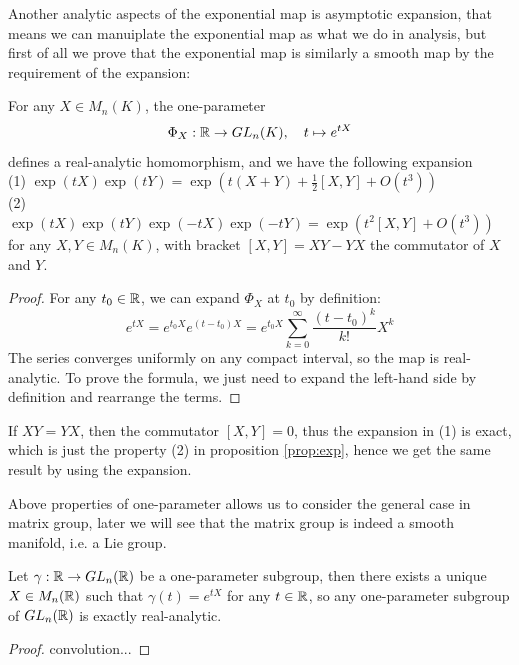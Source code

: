 Another analytic aspects of the exponential map is asymptotic expansion, that means we can manuiplate the exponential map as what we do in analysis, but first of all we prove that the exponential map is similarly a smooth map by the requirement of the expansion:

\begin{proposition}
    For any \(X \in M_n(K)\), the one-parameter
    \[\Phi_X: \mathbb{R} \to GL_n(K), \quad t \mapsto e^{tX}\]
    defines a real-analytic homomorphism, and we have the following expansion\\

    (1) \(\exp(tX)\exp(tY) = \exp(t(X+Y)+\frac{1}{2}[X,Y]+O(t^3))\)\\
    
    (2) \(\exp(tX)\exp(tY)\exp(-tX)\exp(-tY) = \exp(t^2[X,Y]+O(t^3))\)\\

    for any \(X,Y \in M_n(K)\), with bracket \([X,Y] = XY - YX\) the commutator of \(X\) and \(Y\).
\end{proposition}
\begin{proof}
    For any \(t_0 \in \mathbb{R}\), we can expand \(\Phi_X\) at \(t_0\) by definition:
    \[e^{tX} = e^{t_0X}e^{(t-t_0)X} = e^{t_0X} \sum_{k=0}^\infty \frac{(t-t_0)^k}{k!} X^k\]
    The series converges uniformly on any compact interval, so the map is real-analytic. To prove the formula, we just need to expand the left-hand side by definition and rearrange the terms.
\end{proof}

\begin{remark}
    If \(XY = YX\), then the commutator \([X,Y] = 0\), thus the expansion in (1) is exact, which is just the property (2) in proposition \ref{prop:exp}, hence we get the same result by using the expansion.
\end{remark}

Above properties of one-parameter allows us to consider the general case in matrix group, later we will see that the matrix group is indeed a smooth manifold, i.e. a Lie group.

\begin{theorem}
    Let \(\gamma: \mathbb{R} \to GL_n(\mathbb{R})\) be a one-parameter subgroup, then there exists a unique \(X \in M_n(\mathbb{R})\) such that \(\gamma(t) = e^{tX}\) for any \(t \in \mathbb{R}\), so any one-parameter subgroup of \(GL_n(\mathbb{R})\) is exactly real-analytic.
\end{theorem}
\begin{proof}
    convolution...
\end{proof}

